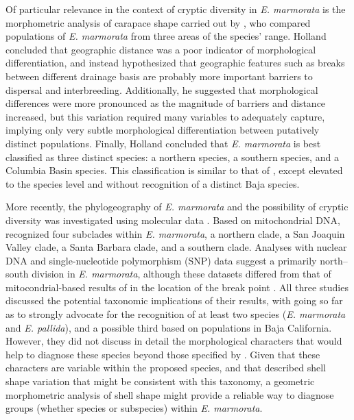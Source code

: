 \documentclass[fleqn,10pt,lineno]{wlpeerj} %
\begin{document}
Of particular relevance in the context of cryptic diversity in \textit{E. marmorata} is the morphometric analysis of carapace shape carried out by \citet{Holland1992}, who compared populations of \textit{E. marmorata} from three areas of the species' range. Holland concluded that geographic distance was a poor indicator of morphological differentiation, and instead hypothesized that geographic features such as breaks between different drainage basis are probably more important barriers to dispersal and interbreeding. Additionally, he suggested that morphological differences were more pronounced as the magnitude of barriers and distance increased, but this variation required many variables to adequately capture, implying only very subtle morphological differentiation between putatively distinct populations. Finally, Holland concluded that \textit{E. marmorata} is best classified as three distinct species: a northern species, a southern species, and a Columbia Basin species. This classification is similar to that of \citet{Seeliger1945}, except elevated to the species level and without recognition of a distinct Baja species. 

More recently, the phylogeography of \textit{E. marmorata} and the possibility of cryptic diversity was investigated using molecular data \citep{Spinks2005,Spinks2010,Spinks2014}. Based on mitochondrial DNA, \citet{Spinks2005} recognized four subclades within \textit{E. marmorata}, a northern clade, a San Joaquin Valley clade, a Santa Barbara clade, and a southern clade. Analyses with nuclear DNA \citep{Spinks2010} and single-nucleotide polymorphism (SNP) data suggest a primarily north--south division in \textit{E. marmorata}, although these datasets differed from that of mitocondrial-based results of \citet{Spinks2005} in the location of the break point \citep{Spinks2014}. All three studies discussed the potential taxonomic implications of their results, with \citet{Spinks2014} going so far as to strongly advocate for the recognition of at least two species (\emph{E. marmorata} and \emph{E. pallida}), and a possible third based on populations in Baja California. However, they did not discuss in detail the morphological characters that would help to diagnose these species beyond those specified by \citet{Seeliger1945}. Given that these characters are variable within the proposed species, and that \citet{Holland1992} described shell shape variation that might be consistent with this taxonomy, a geometric morphometric analysis of shell shape might provide a reliable way to diagnose groups (whether species or subspecies) within \textit{E. marmorata}.
\end{document}
